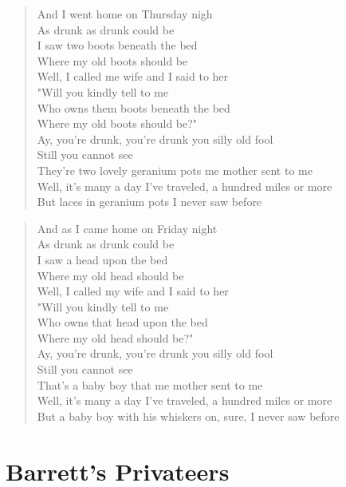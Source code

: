 \documentclass[8pt,twoside]{extarticle}
\newenvironment{xverse}{
	\penalty 10000
	\begin{verse}
	\parskip 4pt
	}
	{
	\end{verse}
	\penalty 0
	}
\begin{document}
\begin{xverse}
And I went home on Thursday nigh \\
As drunk as drunk could be \\
I saw two boots beneath the bed \\
Where my old boots should be \\
Well, I called me wife and I said to her \\
"Will you kindly tell to me \\
Who owns them boots beneath the bed \\
Where my old boots should be?" \\
Ay, you're drunk, you're drunk you silly old fool \\
Still you cannot see \\
They're two lovely geranium pots me mother sent to me \\
Well, it's many a day I've traveled, a hundred miles or more \\
But laces in geranium pots I never saw before \\
\end{xverse}

\begin{xverse}
And as I came home on Friday night \\
As drunk as drunk could be \\
I saw a head upon the bed \\
Where my old head should be \\
Well, I called my wife and I said to her \\
"Will you kindly tell to me \\
Who owns that head upon the bed \\
Where my old head should be?" \\
Ay, you're drunk, you're drunk you silly old fool \\
Still you cannot see \\
That's a baby boy that me mother sent to me \\
Well, it's many a day I've traveled, a hundred miles or more \\
But a baby boy with his whiskers on, sure, I never saw before \\
\end{xverse}

\section{Barrett's Privateers}
\end{document}
